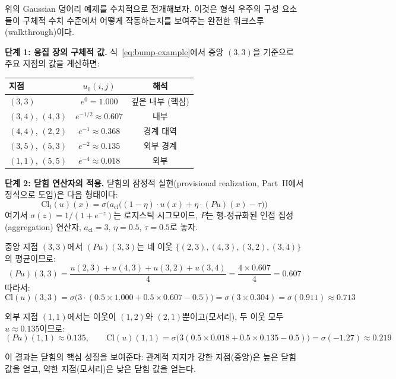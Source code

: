 위의 Gaussian 덩어리 예제를 수치적으로 전개해보자. 이것은 형식 우주의 구성 요소들이 구체적 수치 수준에서 어떻게 작동하는지를 보여주는 완전한 워크스루(walkthrough)이다.

\textbf{단계 1: 응집 장의 구체적 값.} 식~\eqref{eq:bump-example}에서 중앙 $(3,3)$을 기준으로 주요 지점의 값을 계산하면:
\begin{center}
\begin{tabular}{lcc}
\hline
\textbf{지점} & \textbf{$u_0(i,j)$} & \textbf{해석} \\
\hline
$(3,3)$ & $e^0 = 1.000$ & 깊은 내부 (핵심) \\
$(3,4)$, $(4,3)$ & $e^{-1/2} \approx 0.607$ & 내부 \\
$(4,4)$, $(2,2)$ & $e^{-1} \approx 0.368$ & 경계 대역 \\
$(3,5)$, $(5,3)$ & $e^{-2} \approx 0.135$ & 외부 경계 \\
$(1,1)$, $(5,5)$ & $e^{-4} \approx 0.018$ & 외부 \\
\hline
\end{tabular}
\end{center}

\textbf{단계 2: 닫힘 연산자의 적용.} 닫힘의 잠정적 실현(provisional realization, Part~II에서 정식으로 도입)은 다음 형태이다:
\begin{equation}
    \mathrm{Cl}_t(u)(x) = \sigma\!\Big( a_{\mathrm{cl}} \big( (1-\eta) \cdot u(x) + \eta \cdot (Pu)(x) - \tau \big) \Big)
    \label{eq:cl-provisional-ch3}
\end{equation}
여기서 $\sigma(z) = 1/(1+e^{-z})$는 로지스틱 시그모이드, $P$는 행-정규화된 인접 집성(aggregation) 연산자, $a_{\mathrm{cl}} = 3$, $\eta = 0.5$, $\tau = 0.5$로 놓자.

중앙 지점 $(3,3)$에서 $(Pu)(3,3)$는 네 이웃 $\{(2,3),(4,3),(3,2),(3,4)\}$의 평균이므로:
\[
    (Pu)(3,3) = \frac{u(2,3) + u(4,3) + u(3,2) + u(3,4)}{4} = \frac{4 \times 0.607}{4} = 0.607
\]
따라서:
\[
    \mathrm{Cl}(u)(3,3) = \sigma\big(3 \cdot (0.5 \times 1.000 + 0.5 \times 0.607 - 0.5)\big) = \sigma(3 \times 0.304) = \sigma(0.911) \approx 0.713
\]

외부 지점 $(1,1)$에서는 이웃이 $(1,2)$와 $(2,1)$뿐이고(모서리), 두 이웃 모두 $u \approx 0.135$이므로:
\[
    (Pu)(1,1) \approx 0.135, \qquad \mathrm{Cl}(u)(1,1) = \sigma\big(3(0.5 \times 0.018 + 0.5 \times 0.135 - 0.5)\big) = \sigma(-1.27) \approx 0.219
\]

이 결과는 닫힘의 핵심 성질을 보여준다: 관계적 지지가 강한 지점(중앙)은 높은 닫힘 값을 얻고, 약한 지점(모서리)은 낮은 닫힘 값을 얻는다.

